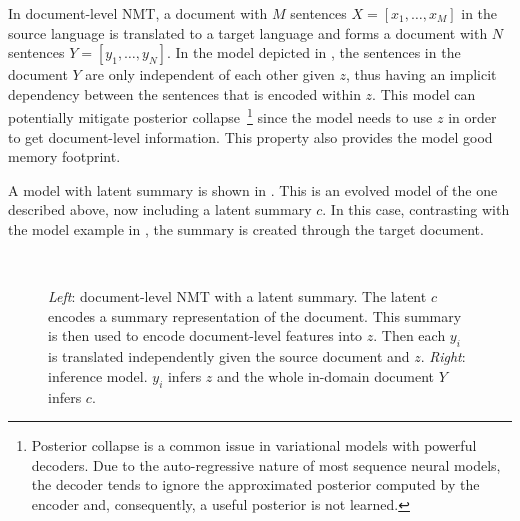 In document-level NMT, a document with $M$ sentences $X=[x_1, \dots,
    x_M]$ in the source language is translated to a target language and
forms a document with $N$ sentences $Y=[y_1, \dots, y_N]$. In the
model depicted in , the sentences in the
document $Y$ are only independent of each other given $z$, thus
having an implicit dependency between the sentences that is encoded
within $z$. This model can potentially mitigate posterior
collapse~\footnote{Posterior collapse is a common issue in
    variational models with powerful decoders. Due to the auto-regressive
    nature of most sequence neural models, the decoder tends to ignore
    the approximated posterior computed by the encoder and, consequently,
    a useful posterior is not learned.} since the model needs to use $z$
in order to get document-level information. This property also
provides the model good memory footprint.

A model with latent summary is shown in
. This is an evolved model of the
one described above, now including a latent summary $c$. In this
case, contrasting with the model example in
, the summary is created through the
target document.

\begin{figure}[t]
    \centering
    ~

    \caption{{\it Left}: document-level NMT with a latent summary.
        The latent $c$ encodes a summary representation of the document.
        This summary is then used to encode
        document-level features into $z$. Then each $y_i$ is translated
        independently given the source document and $z$. {\it Right}:
        inference model. $y_i$ infers $z$ and the whole in-domain
        document $Y$ infers $c$.}
    \label{fig:doclevelstatistician}

\end{figure}

\cleardoublepage
